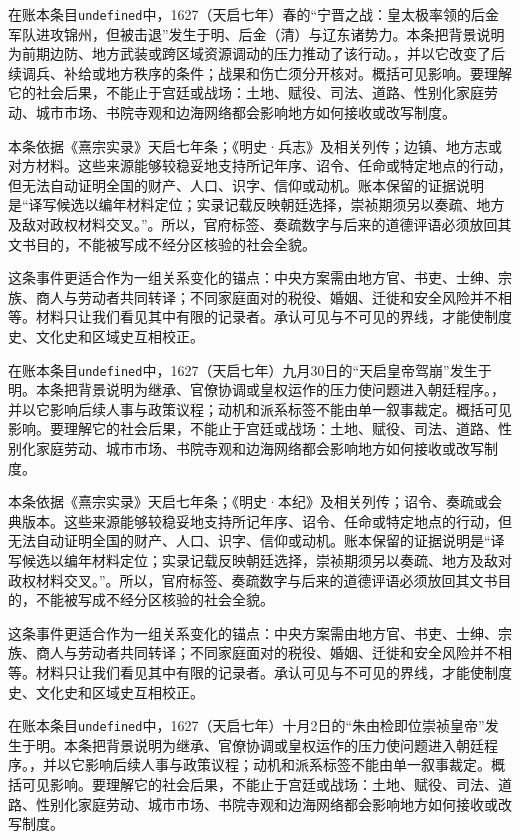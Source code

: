 在账本条目\texttt{undefined}中，1627（天启七年）春的“宁晋之战：皇太极率领的后金军队进攻锦州，但被击退”发生于明、后金（清）与辽东诸势力。本条把背景说明为前期边防、地方武装或跨区域资源调动的压力推动了该行动。，并以它改变了后续调兵、补给或地方秩序的条件；战果和伤亡须分开核对。概括可见影响。要理解它的社会后果，不能止于宫廷或战场：土地、赋役、司法、道路、性别化家庭劳动、城市市场、书院寺观和边海网络都会影响地方如何接收或改写制度。

本条依据《熹宗实录》天启七年条；《明史·兵志》及相关列传；边镇、地方志或对方材料。这些来源能够较稳妥地支持所记年序、诏令、任命或特定地点的行动，但无法自动证明全国的财产、人口、识字、信仰或动机。账本保留的证据说明是“译写候选以编年材料定位；实录记载反映朝廷选择，崇祯期须另以奏疏、地方及敌对政权材料交叉。”。所以，官府标签、奏疏数字与后来的道德评语必须放回其文书目的，不能被写成不经分区核验的社会全貌。

这条事件更适合作为一组关系变化的锚点：中央方案需由地方官、书吏、士绅、宗族、商人与劳动者共同转译；不同家庭面对的税役、婚姻、迁徙和安全风险并不相等。材料只让我们看见其中有限的记录者。承认可见与不可见的界线，才能使制度史、文化史和区域史互相校正。

在账本条目\texttt{undefined}中，1627（天启七年）九月30日的“天启皇帝驾崩”发生于明。本条把背景说明为继承、官僚协调或皇权运作的压力使问题进入朝廷程序。，并以它影响后续人事与政策议程；动机和派系标签不能由单一叙事裁定。概括可见影响。要理解它的社会后果，不能止于宫廷或战场：土地、赋役、司法、道路、性别化家庭劳动、城市市场、书院寺观和边海网络都会影响地方如何接收或改写制度。

本条依据《熹宗实录》天启七年条；《明史·本纪》及相关列传；诏令、奏疏或会典版本。这些来源能够较稳妥地支持所记年序、诏令、任命或特定地点的行动，但无法自动证明全国的财产、人口、识字、信仰或动机。账本保留的证据说明是“译写候选以编年材料定位；实录记载反映朝廷选择，崇祯期须另以奏疏、地方及敌对政权材料交叉。”。所以，官府标签、奏疏数字与后来的道德评语必须放回其文书目的，不能被写成不经分区核验的社会全貌。

这条事件更适合作为一组关系变化的锚点：中央方案需由地方官、书吏、士绅、宗族、商人与劳动者共同转译；不同家庭面对的税役、婚姻、迁徙和安全风险并不相等。材料只让我们看见其中有限的记录者。承认可见与不可见的界线，才能使制度史、文化史和区域史互相校正。

在账本条目\texttt{undefined}中，1627（天启七年）十月2日的“朱由检即位崇祯皇帝”发生于明。本条把背景说明为继承、官僚协调或皇权运作的压力使问题进入朝廷程序。，并以它影响后续人事与政策议程；动机和派系标签不能由单一叙事裁定。概括可见影响。要理解它的社会后果，不能止于宫廷或战场：土地、赋役、司法、道路、性别化家庭劳动、城市市场、书院寺观和边海网络都会影响地方如何接收或改写制度。

